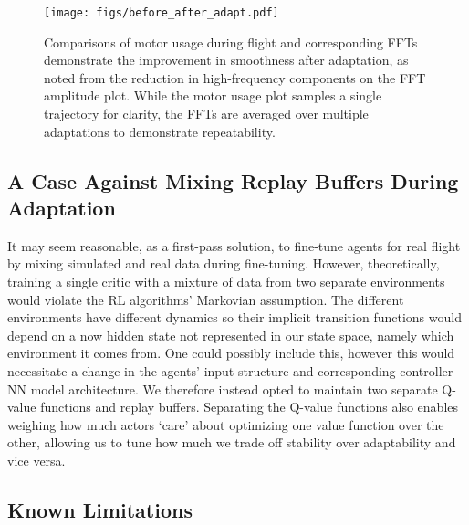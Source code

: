 \documentclass[letterpaper, 10 pt, conference]{ieeeconf} %
\begin{document}
        \begin{figure}[h]
            \centering
            \texttt{[image: figs/before\_after\_adapt.pdf]}
            \caption{
                Comparisons of motor usage during flight and corresponding FFTs demonstrate the improvement in smoothness after adaptation, as noted from the reduction in high-frequency components on the FFT amplitude plot. 
                While the motor usage plot samples a single trajectory for clarity, the FFTs are averaged over multiple adaptations to demonstrate repeatability.
            }
            \label{fig:fouriers}
            \vspace{-1.5\baselineskip}
        \end{figure}
        

        
    \subsection{A Case Against Mixing Replay Buffers During Adaptation}\label{subsec:mixedBuffers}
        
        It may seem reasonable, as a first-pass solution, to fine-tune agents for real flight by mixing simulated and real data during fine-tuning.
        However, theoretically, training a single critic with a mixture of data from two separate environments would violate the RL algorithms’ Markovian assumption.
        The different environments have different dynamics so their implicit transition functions would depend on a now hidden state not represented in our state space, namely which environment it comes from.
        One could possibly include this, however this would necessitate a change in the agents' input structure and corresponding controller NN model architecture.
        We therefore instead opted to maintain two separate Q-value functions and replay buffers. 
        Separating the Q-value functions also enables weighing how much actors ‘care’ about optimizing one value function over the other, allowing us to tune how much we trade off stability over adaptability and vice versa.

    \subsection{Known Limitations}\label{subsec:limitations}
\end{document}
